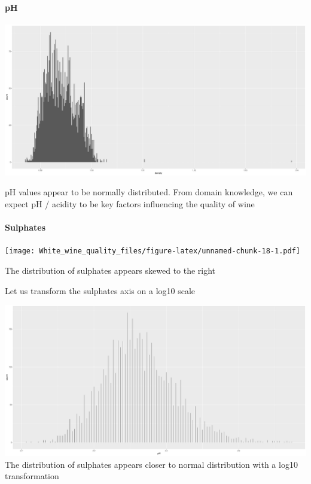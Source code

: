 \documentclass[]{article}
\let\oldparagraph\paragraph
\renewcommand{\paragraph}[1]{\oldparagraph{#1}\mbox{}}
\begin{document}
\paragraph{pH}\label{ph}

\includegraphics{White_wine_quality_files/figure-latex/unnamed-chunk-17-1.pdf}

pH values appear to be normally distributed. From domain knowledge, we
can expect pH / acidity to be key factors influencing the quality of
wine

\paragraph{Sulphates}\label{sulphates}

\texttt{[image: White\_wine\_quality\_files/figure-latex/unnamed-chunk-18-1.pdf]}

The distribution of sulphates appears skewed to the right

Let us transform the sulphates axis on a log10 scale

\includegraphics{White_wine_quality_files/figure-latex/unnamed-chunk-19-1.pdf}
The distribution of sulphates appears closer to normal distribution with
a log10 transformation
\end{document}

